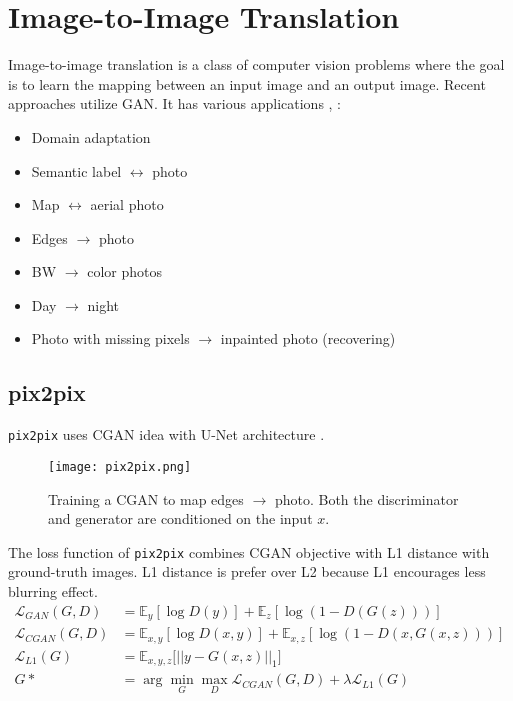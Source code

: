 \section{Image-to-Image Translation}
Image-to-image translation is a class of computer vision problems where the goal is to learn the mapping between an input image and an output image. Recent approaches utilize \ac{GAN}. It has various applications \cite{isola2017image, zhu2017unpaired}, \eg:
\begin{itemize}
	\item Domain adaptation
	\item Semantic label $\leftrightarrow$ photo
	\item Map $\leftrightarrow$ aerial photo
	\item Edges $\rightarrow$ photo
	\item BW $\rightarrow$ color photos
	\item Day $\rightarrow$ night
	\item Photo with missing pixels $\rightarrow$ inpainted photo (recovering)
\end{itemize}

\subsection{pix2pix}
\texttt{pix2pix} uses \ac{CGAN} idea with U-Net architecture \cite{isola2017image}.
\begin{figure}[hbt!]
	\centering
	\texttt{[image: pix2pix.png]}
	\caption{Training a \ac{CGAN} to map edges $\rightarrow$ photo. Both the discriminator and generator are conditioned on the input $x$. \cite{isola2017image}}
\end{figure}

The loss function of \texttt{pix2pix} combines \ac{CGAN} objective with L1 distance with ground-truth images. L1 distance is prefer over L2 because L1 encourages less blurring effect.
\begin{align}
	\mathcal{L}_{GAN}(G,D) &= \mathbb{E}_y [\log D(y)] + \mathbb{E}_z [\log (1-D(G(z)))]\\
	\mathcal{L}_{CGAN}(G,D) &= \mathbb{E}_{x,y} [\log D(x,y)] + \mathbb{E}_{x,z} [\log (1-D(x,G(x,z)))]\\
	\mathcal{L}_{L1}(G) &= \mathbb{E}_{x,y,z} \big[ ||y-G(x,z)||_1 \big]\\
	G* &= \arg \underset{G}{\min} \underset{D}{\max} \mathcal{L}_{CGAN}(G,D) + \lambda \mathcal{L}_{L1}(G)
\end{align}

